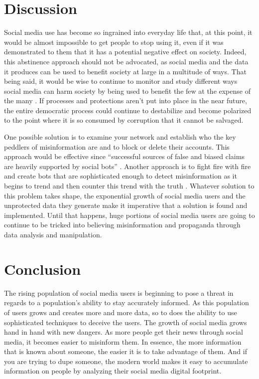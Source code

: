 \documentclass[sigconf]{acmart}
\begin{document}
\section{Discussion}

Social media use has become so ingrained into everyday life that, at this point, it would be almost impossible to get people to stop using it, even if it was demonstrated to them that it has a potential negative effect on society. Indeed, this abstinence approach should not be advocated, as social media and the data it produces can be used to benefit society at large in a multitude of ways. That being said, it would be wise to continue to monitor and study different ways social media can harm society by being used to benefit the few at the expense of the many \cite{Rodrigo2017}. If processes and protections aren't put into place in the near future, the entire democratic process could continue to destabilize and become polarized to the point where it is so consumed by corruption that it cannot be salvaged.

One possible solution is to examine your network and establish who the key peddlers of misinformation are and to block or delete their accounts. This approach would be effective since ``successful sources of false and biased claims are heavily supported by social bots'' \cite{Shao2017}.  Another approach is to fight fire with fire and create bots that are sophisticated enough to detect misinformation as it begins to trend and then counter this trend with the truth \cite{Budak2011}. Whatever solution to this problem takes shape, the exponential growth of social media users and the unprotected data they generate \cite{Perrin2015} make it imperative that a solution is found and implemented. Until that happens, huge portions of social media users are going to continue to be tricked into believing misinformation and propaganda through data analysis and manipulation.

\section{Conclusion}

The rising population of social media users is beginning to pose a threat in regards to a population's ability to stay accurately informed. As this population of users grows and creates more and more data, so to does the ability to use sophisticated techniques to deceive the users. The growth of social media grows hand in hand with new dangers. As more people get their news through social media, it becomes easier to misinform them. In essence, the more information that is known about someone, the easier it is to take advantage of them. And if you are trying to dupe someone, the modern world makes it easy to accumulate information on people by analyzing their social media digital footprint.
\end{document}
